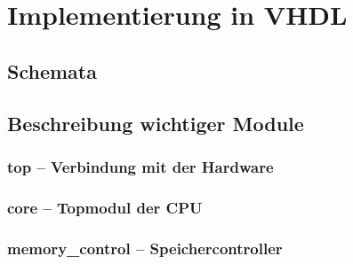 \chapter{Implementierung in VHDL}
\label{c:vhdl}
\section{Schemata}
\pagebreak
\section{Beschreibung wichtiger Module}
\subsection{top -- Verbindung mit der Hardware}
\pagebreak
\subsection{core -- Topmodul der CPU}
\pagebreak
\subsection{memory\_control -- Speichercontroller}
\pagebreak
